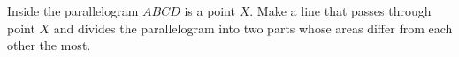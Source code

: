 Inside the parallelogram $ABCD$ is a point $X$. Make a line that passes through point $X$ and divides the parallelogram into two parts whose areas differ from each other the most.